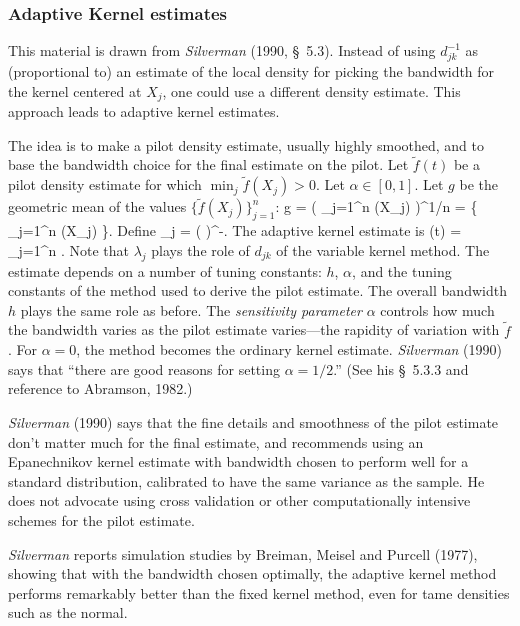 \subsubsection{Adaptive Kernel estimates}
This material is drawn from {\em Silverman\/} (1990, \S~5.3).
Instead of using $d_{jk}^{-1}$ as (proportional to) an estimate of the local
density for picking the bandwidth for the kernel centered at $X_j$, one
could use a different density estimate.
This approach leads to adaptive kernel estimates.

The idea is to make a pilot density estimate, usually highly smoothed,
and to base the bandwidth choice for the final estimate on the pilot.
Let $\tilde{f}(t)$ be a pilot density estimate for which $\min_j \tilde{f}(X_j) > 0$.
Let $\alpha \in [0, 1]$.
Let $g$ be the geometric mean of the values $\{\tilde{f}(X_j)\}_{j=1}^n$:
\beq
    g = \left ( \prod_{j=1}^n (X_j) \right )^{1/n} = \exp \left \{ 
        \sum_{j=1}^n \log {}(X_j) \right \}.
\eeq
Define
\beq
    \lambda_j = \left (  \right )^{-\alpha}.
\eeq
The adaptive kernel estimate is
\beq
    (t) =  \sum_{j=1}^n .
\eeq
Note that $\lambda_j$ plays the role of $d_{jk}$ of the variable kernel method.
The estimate depends on a number of tuning constants: $h$, $\alpha$, and the
tuning constants of the method used to derive the pilot estimate.
The overall bandwidth $h$ plays the same role as before.
The {\em sensitivity parameter\/} $\alpha$ controls how much the bandwidth varies
as the pilot estimate varies---the rapidity of variation with $\tilde{f}$.
For $\alpha=0$, the method becomes the ordinary kernel estimate.
{\em Silverman\/} (1990) says that ``there are good reasons for setting $\alpha=1/2$.''
(See his \S~5.3.3 and reference to Abramson, 1982.)

{\em Silverman\/} (1990)
says that the fine details and smoothness of the pilot estimate don't matter much
for the final estimate, and recommends using an Epanechnikov kernel estimate
with bandwidth chosen to perform well for a standard distribution, calibrated to
have the same variance as the sample.
He does not advocate using cross validation or other computationally intensive
schemes for the pilot estimate.

{\em Silverman\/} reports simulation studies by Breiman, Meisel and Purcell (1977),
showing that with the bandwidth chosen optimally, the adaptive
kernel method performs remarkably better than the fixed kernel method,
even for tame densities such as the normal.

